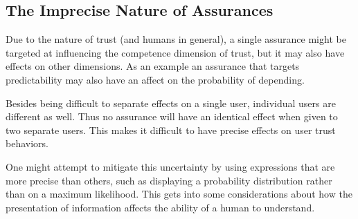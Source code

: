 \subsection{The Imprecise Nature of Assurances}
    Due to the nature of trust (and humans in general), a single assurance might be targeted at influencing the competence dimension of trust, but it may also have effects on other dimensions. As an example an assurance that targets predictability may also have an affect on the probability of depending.

    Besides being difficult to separate effects on a single user, individual users are different as well. Thus no assurance will have an identical effect when given to two separate users. This makes it difficult to have precise effects on user trust behaviors.

    One might attempt to mitigate this uncertainty by using expressions that are more precise than others, such as displaying a probability distribution rather than on a maximum likelihood. This gets into some considerations about how the presentation of information affects the ability of a human to understand.
%

